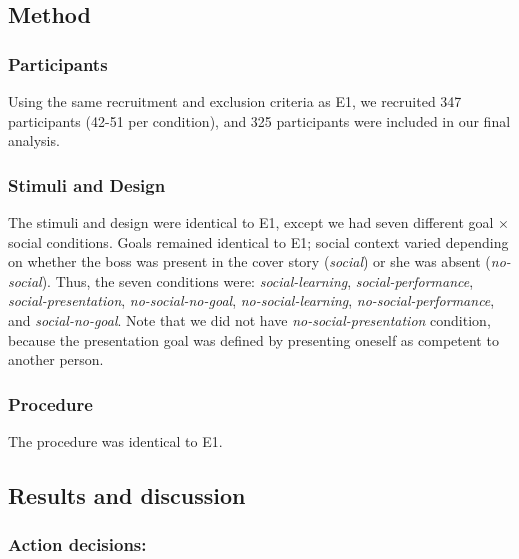 \documentclass[10pt, letterpaper]{article}
\begin{document}
\subsection{Method}\label{method-1}

\subsubsection{Participants}\label{participants-1}

Using the same recruitment and exclusion criteria as E1, we recruited
347 participants (42-51 per condition), and 325 participants were
included in our final analysis.

\subsubsection{Stimuli and Design}\label{stimuli-and-design-1}

The stimuli and design were identical to E1, except we had seven
different goal \(\times\) social conditions. Goals remained identical to
E1; social context varied depending on whether the boss was present in
the cover story (\emph{social}) or she was absent (\emph{no-social}).
Thus, the seven conditions were: \emph{social-learning},
\emph{social-performance}, \emph{social-presentation},
\emph{no-social-no-goal}, \emph{no-social-learning},
\emph{no-social-performance}, and \emph{social-no-goal}. Note that we
did not have \emph{no-social-presentation} condition, because the
presentation goal was defined by presenting oneself as competent to
another person.

\subsubsection{Procedure}\label{procedure-1}

The procedure was identical to E1.

\subsection{Results and discussion}\label{results-and-discussion-1}

\subsubsection{Action decisions:}\label{action-decisions-1}
\end{document}
